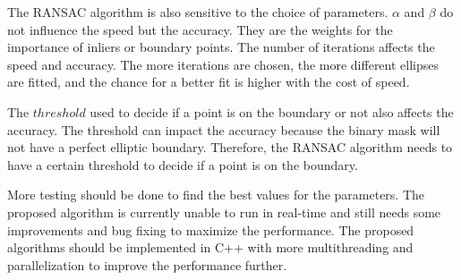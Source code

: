 The RANSAC algorithm is also sensitive to the choice of parameters. $\alpha$ and $\beta$ do not influence the speed but the accuracy. They are the weights for the importance of inliers or boundary points. The number of iterations affects the speed and accuracy. The more iterations are chosen, the more different ellipses are fitted, and the chance for a better fit is higher with the cost of speed.

The $threshold$ used to decide if a point is on the boundary or not also affects the accuracy. The threshold can impact the accuracy because the binary mask will not have a perfect elliptic boundary. Therefore, the RANSAC algorithm needs to have a certain threshold to decide if a point is on the boundary. 

More testing should be done to find the best values for the parameters. The proposed algorithm is currently unable to run in real-time and still needs some improvements and bug fixing to maximize the performance. The proposed algorithms should be implemented in C++ with more multithreading and parallelization to improve the performance further. 